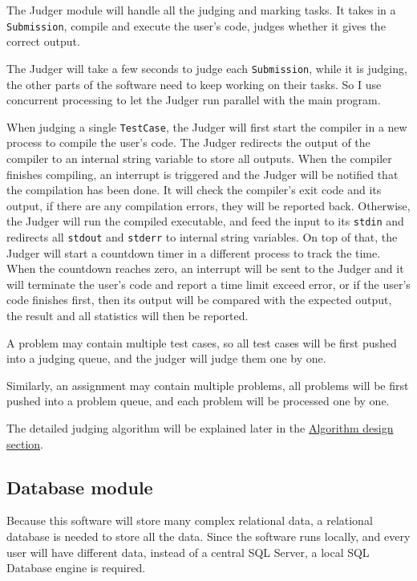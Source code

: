 \documentclass[a4paper]{report}
\begin{document}
The Judger module will handle all the judging and marking tasks. It takes in a \texttt{Submission}, compile and execute the user's code, judges whether it gives the correct output.

The Judger will take a few seconds to judge each \texttt{Submission}, while it is judging, the other parts of the software need to keep working on their tasks. So I use concurrent processing to let the Judger run parallel with the main program.

When judging a single \texttt{TestCase}, the Judger will first start the compiler in a new process to compile the user's code. The Judger redirects the output of the compiler to an internal string variable to store all outputs. When the compiler finishes compiling, an interrupt is triggered and the Judger will be notified that the compilation has been done. It will check the compiler's exit code and its output, if there are any compilation errors, they will be reported back. Otherwise, the Judger will run the compiled executable, and feed the input to its \texttt{stdin} and redirects all \texttt{stdout} and \texttt{stderr} to internal string variables. On top of that, the Judger will start a countdown timer in a different process to track the time. When the countdown reaches zero, an interrupt will be sent to the Judger and it will terminate the user's code and report a time limit exceed error, or if the user's code finishes first, then its output will be compared with the expected output, the result and all statistics will then be reported.

A problem may contain multiple test cases, so all test cases will be first pushed into a judging queue, and the judger will judge them one by one.

Similarly, an assignment may contain multiple problems, all problems will be first pushed into a problem queue, and each problem will be processed one by one.

The detailed judging algorithm will be explained later in the 
\hyperref[sec:algorithm design]{Algorithm design section}.

\subsection{Database module}

Because this software will store many complex relational data, a relational database is needed to store all the data. Since the software runs locally, and every user will have different data, instead of a central SQL Server, a local SQL Database engine is required.
\end{document}
